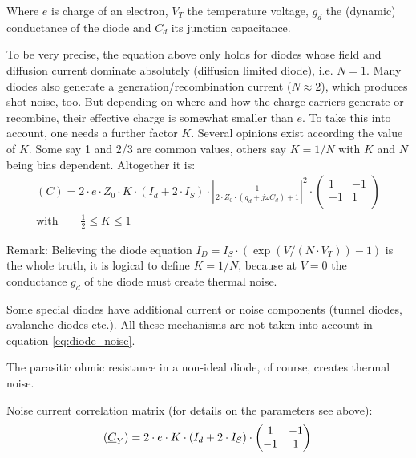 Where $e$ is charge of an electron, $V_T$ the temperature voltage,
$g_d$ the (dynamic) conductance of the diode and $C_d$ its junction
capacitance.

\addvspace{12pt}

To be very precise, the equation above only holds for diodes whose
field and diffusion current dominate absolutely (diffusion limited
diode), i.e. $N=1$.  Many diodes also generate a
generation/recombination current ($N\approx 2$), which produces shot
noise, too.  But depending on where and how the charge carriers
generate or recombine, their effective charge is somewhat smaller than
$e$.  To take this into account, one needs a further factor $K$.
Several opinions exist according the value of $K$.  Some say 1 and 2/3
are common values, others say $K=1/N$ with $K$ and $N$ being bias
dependent.  Altogether it is:
\begin{equation}
\begin{split}
(\underline{C})
 = 2\cdot e\cdot Z_0\cdot K\cdot \left(I_{d} + 2\cdot I_{S}\right)\cdot
    \left| \frac{1}{2\cdot Z_0\cdot (g_d+j\omega C_d) + 1}\right|^2 \cdot
\begin{pmatrix}
   1 & -1\\
  -1 &  1\\
\end{pmatrix}\\
\text{with}\qquad\frac{1}{2}\le K \le 1
\end{split}
\label{eq:diode_noise}
\end{equation}

Remark: Believing the diode equation $I_D = I_S\cdot (\exp(V/(N\cdot
V_T)) - 1)$ is the whole truth, it is logical to define $K=1/N$,
because at $V=0$ the conductance $g_d$ of the diode must create
thermal noise.

\addvspace{12pt}

Some special diodes have additional current or noise components
(tunnel diodes, avalanche diodes etc.).  All these mechanisms are not
taken into account in equation \eqref{eq:diode_noise}.

\addvspace{12pt}

The parasitic ohmic resistance in a non-ideal diode, of course,
creates thermal noise.

Noise current correlation matrix (for details on the parameters
see above):
\begin{equation}
(\underline{C}_Y)
 = 2\cdot e\cdot K\cdot \left(I_{d} + 2\cdot I_{S}\right)\cdot
\begin{pmatrix}
   1 & -1\\
  -1 &  1\\
\end{pmatrix}\\
\end{equation}


